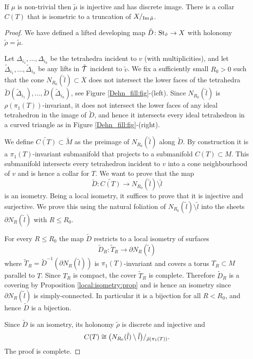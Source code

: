 \begin{prop} \label{DF:prop}
If $\mu$ is non-trivial then $\tilde\mu$ is injective and has discrete image. There is a collar $C(T)$ that is isometric to a truncation of $X/_{{\rm Im\,} \tilde\mu}$.
\end{prop}
\begin{proof}
We have defined a lifted developing map $\tilde D\colon {\rm St}_{\tilde v} \to X$ with holonomy $\tilde\rho = \tilde \mu$.

Let $\Delta_{i_1}, \ldots, \Delta_{i_h}$ be the tetrahedra incident to $v$ (with multiplicities), and let $\tilde\Delta_{i_1}, \ldots, \tilde\Delta_{i_h}$ be any lifts in $\tilde{\mathcal{T}}$ incident to $\tilde v$. We fix a sufficiently small $R_0>0$ such that the cone $N_{R_0}(\tilde l)\subset \overline X$ does not intersect the lower faces of the tetrahedra $\tilde D(\tilde\Delta_{i_1}), \ldots, \tilde D(\tilde\Delta_{i_h})$, see Figure \ref{Dehn_fill:fig}-(left). Since $N_{R_0}(\tilde l)$ is $\rho(\pi_1(T))$-invariant, it does not intersect the lower faces of any ideal tetrahedron in the image of $\tilde D$, and hence it intersects every ideal tetrahedron in a curved triangle as in Figure \ref{Dehn_fill:fig}-(right).

We define $\widetilde {C(T)}\subset \tilde M$ as the preimage of $N_{R_0}(\tilde l)$ along $\tilde D$. By construction it is a $\pi_1(T)$-invariant submanifold that projects to a submanifold $C(T) \subset M$. This submanifold intersects every tetrahedron incident to $v$ into a cone neighbourhood of $v$ and is hence a collar for $T$. We want to prove that the map
$$\tilde D\colon \widetilde {C(T)} \longrightarrow N_{R_0}(\tilde l) \setminus \tilde l$$
is an isometry. Being a local isometry, it suffices to prove that it is injective and surjective. We prove this using the natural foliation of $N_{R_0}(\tilde l)\setminus \tilde l$ into the sheets $\partial N_{R}(\tilde l)$ with $R\leqslant R_0$.

For every $R\leqslant R_0$ the map $\tilde D$ restricts to a local isometry of surfaces
$$\tilde D_R\colon \tilde {T}_R\to \partial N_R(\tilde l)$$
where $\tilde {T}_R = \tilde D^{-1}(\partial N_R(\tilde l))$ is $\pi_1(T)$-invariant and covers a torus $T_R\subset M$ parallel to $T$. Since $T_R$ is compact, the cover $\tilde T_R$ is complete. Therefore $\tilde D_R$ is a covering by Proposition \ref{local:isometry:prop} and is hence an isometry since $\partial N_R(\tilde l)$ is simply-connected. In particular it is a bijection for all $R<R_0$, and hence $\tilde D$ is a bijection.

Since $\tilde D$ is an isometry, its holonomy $\tilde\rho$ is discrete and injective and 
$$C(T) \cong \big(N_{R_0}(\tilde l) \setminus \tilde l \big)/_{\tilde\rho(\pi_1(T))}.$$
The proof is complete.
\end{proof}

